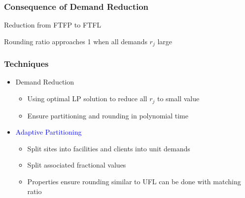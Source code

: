 \documentclass[handout, hyperref, dvipsnames]{beamer}
\begin{document}
\begin{frame}
  \frametitle{Consequence of Demand Reduction}
  \begin{itemize}
    \addtolength{\itemsep}{1\baselineskip}
    \large{
    \item Reduction from FTFP to FTFL
    \item Rounding ratio approaches 1 when all demands $r_j$
      large}
  \end{itemize}
\end{frame}

\begin{frame}

  \frametitle{Techniques}
  \begin{itemize}\addtolength{\itemsep}{2\baselineskip}

  \item {\Large {Demand Reduction}}
    \vspace{.1in}
    \begin{itemize}\addtolength{\itemsep}{1\baselineskip}
    \item  {\large Using optimal LP solution to reduce all $r_j$ to small value}
    \item  {\large Ensure partitioning and rounding in polynomial time}
    \end{itemize}
    
  \item {\Large \textcolor{blue}{Adaptive Partitioning}}
    \vspace{.1in}
    \begin{itemize}\addtolength{\itemsep}{1\baselineskip}
    \item \alert{\large Split sites into facilities and clients into unit demands}
    \item \alert{\large Split associated fractional values}
    \item \alert{\large Properties ensure rounding similar to UFL can be done with matching ratio}
    \end{itemize}
  \end{itemize}
\end{frame}
\end{document}
